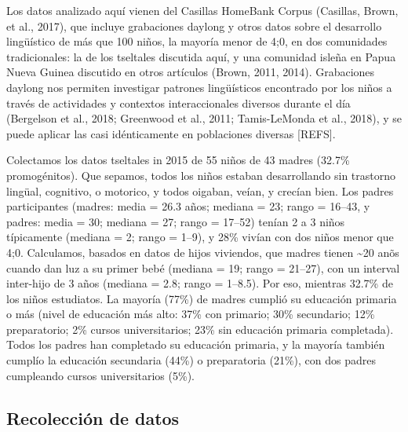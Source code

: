 \documentclass[
  english,
  ,man,floatsintext]{apa6}
\begin{document}
Los datos analizado aquí vienen del Casillas HomeBank Corpus (Casillas, Brown, et al., 2017), que incluye grabaciones daylong y otros datos sobre el desarrollo lingüístico de más que 100 niños, la mayoría menor de 4;0, en dos comunidades tradicionales: la de los tseltales discutida aquí, y una comunidad isleña en Papua Nueva Guinea discutido en otros artículos (Brown, 2011, 2014). Grabaciones daylong nos permiten investigar patrones lingüísticos encontrado por los niños a través de actividades y contextos interaccionales diversos durante el día (Bergelson et al., 2018; Greenwood et al., 2011; Tamis-LeMonda et al., 2018), y se puede aplicar las casi idénticamente en poblaciones diversas {[}REFS{]}.

Colectamos los datos tseltales in 2015 de 55 niños de 43 madres (32.7\% promogénitos). Que sepamos, todos los niños estaban desarrollando sin trastorno lingüal, cognitivo, o motorico, y todos oigaban, veían, y crecían bien. Los padres participantes (madres: media = 26.3 años; mediana = 23; rango = 16--43, y padres: media = 30; mediana = 27; rango = 17--52) tenían 2 a 3 niños típicamente (mediana = 2; rango = 1--9), y 28\% vivían con dos niños menor que 4;0. Calculamos, basados en datos de hijos viviendos, que madres tienen \textasciitilde20 anõs cuando dan luz a su primer bebé (mediana = 19; rango = 21--27), con un interval inter-hijo de 3 años (mediana = 2.8; rango = 1--8.5). Por eso, mientras 32.7\% de los niños estudiatos. La mayoría (77\%) de madres cumplió su educación primaria o más (nivel de educación más alto: 37\% con primario; 30\% secundario; 12\% preparatorio; 2\% cursos universitarios; 23\% sin educación primaria completada). Todos los padres han completado su educación primaria, y la mayoría también cumplío la educación secundaria (44\%) o preparatoria (21\%), con dos padres cumpleando cursos universitarios (5\%).

\hypertarget{methods-collection}{%
\subsection{Recolección de datos}\label{methods-collection}}
\end{document}
